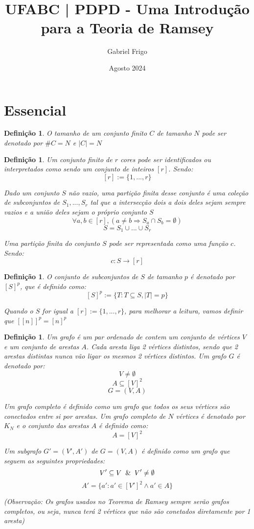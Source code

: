 \documentclass{article}
\title{UFABC | PDPD - Uma Introdução para a Teoria de Ramsey}
\author{Gabriel Frigo}
\date{Agosto 2024}
\newtheorem{defi}[teor]{Definição}
\begin{document}
\maketitle


\section{Essencial}


\begin{defi}
  \label{size_of_set}
  O \emph{tamanho de um conjunto finito} $C$ de tamanho $N$ pode ser denotado por $\#C = N$ e $\mid C \mid = N$
\end{defi}

\begin{defi}
    \label{finite_partition_c}
    Um \emph{conjunto finito de $r$ cores} pode ser identificados ou interpretados como sendo um conjunto de inteiros $[r]$. Sendo:
    \[[r]:=\{1, ..., r\}\]

    Dado um conjunto $S$ não vazio, uma partição finita desse conjunto é uma coleção de subconjuntos de $S_1, ..., S_r$ tal que a intersecção dois a dois deles sejam sempre vazios e a união deles sejam o próprio conjunto $S$
    \[\forall{a,b} \in [r], (a \neq b \Rightarrow S_a \cap S_b = \emptyset)\]
    \[S = S_1 \cup ... \cup S_r \]

    Uma \emph{partição finita do conjunto $S$} pode ser representada como uma função $c$. Sendo:
    \[c:S\rightarrow[r]\]
\end{defi}

\begin{defi}
    \label{subset_p}
    O \emph{conjunto de subconjuntos de $S$ de tamanho $p$} é denotado por $[S]^p$, que é definido como:
    \[[S]^p:=\{T: T \subseteq S, |T| = p\}\]

    Quando o $S$ for igual a $[r]:=\{1, ..., r\}$, para melhorar a leitura, vamos definir que $[[n]]^p = [n]^p$
\end{defi}

\begin{defi}
    \label{graph_g}
    Um \emph{grafo} é um par ordenado de contem um conjunto de vértices $V$ e um conjunto de arestas $A$. Cada aresta liga 2 vértices distintos, sendo que 2 arestas distintas nunca vão ligar os mesmos 2 vértices distintos. Um grafo $G$ é denotado por:
    \[V \neq \emptyset\]
    \[A \subseteq [V]^2\]
    \[G = (V, A)\]

    Um \emph{grafo completo} é definido como um grafo que todos os seus vértices são conectados entre si por arestas. Um grafo completo de $N$ vértices é denotado por $K_N$ e o conjunto das arestas $A$ é definido como:
    \[A = [V]^2\]

    Um \emph{subgrafo} $G' = (V', A')$ de $G = (V, A)$ é definido como um grafo que seguem as seguintes propriedades:
    \[V' \subseteq V \And V' \neq \emptyset\]
    \[A' = \{a': a' \in [V']^2 \wedge a' \in A\}\]

    (Observação: Os grafos usados no \emph{Teorema de Ramsey} sempre serão grafos completos, ou seja, nunca terá 2 vértices que não são conetados diretamente por 1 aresta)
\end{defi}
\end{document}
